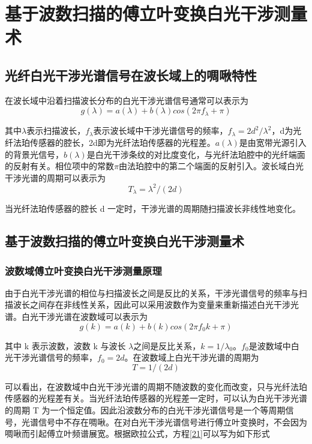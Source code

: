 \chapter{基于波数扫描的傅立叶变换白光干涉测量术}

\section{光纤白光干涉光谱信号在波长域上的啁啾特性}
在波长域中沿着扫描波长分布的白光干涉光谱信号通常可以表示为
\begin{equation}
g(\lambda)=a(\lambda)+b(\lambda)cos(2\pi f_{\lambda}+\pi)
\end{equation}


其中$\lambda$表示扫描波长，$f_{\lambda}$表示波长域中干涉光谱信号的频率，$f_{\lambda}=2d^{2}/\lambda^{2}$，d为光纤法珀传感器的腔长，2d即为光纤法珀传感器的光程差。$a(\lambda)$是由宽带光源引入的背景光信号，$b(\lambda)$是白光干涉条纹的对比度变化，与光纤法珀腔中的光纤端面的反射有关。相位项中的常数$\pi$由法珀腔中的第二个端面的反射引入。波长域白光干涉光谱的周期可以表示为
\begin{equation}
T_{\lambda}=\lambda^{2}/(2d)
\end{equation}


当光纤法珀传感器的腔长 d 一定时，干涉光谱的周期随扫描波长非线性地变化。
\section{基于波数扫描的傅立叶变换白光干涉测量术 }
\subsection{波数域傅立叶变换白光干涉测量原理 }
由于白光干涉光谱的相位与扫描波长之间是反比的关系，干涉光谱信号的频率与扫描波长之间存在非线性关系，因此可以采用波数作为变量来重新描述白光干涉光谱。白光干涉光谱在波数域可以表示为 
\begin{equation}
g(k)=a(k)+b(k)cos(2\pi f_{0}k+\pi)
\label{flyone1}
\end{equation}


其中 k 表示波数，波数 k 与波长 $\lambda$之间是反比关系，$k=1/\lambda_{0}$。$f_0$是波数域中白光干涉光谱信号的频率，$f_{0}=2d$。在波数域上白光干涉光谱的周期为
\begin{equation}
T=1/(2d)
\end{equation}


可以看出，在波数域中白光干涉光谱的周期不随波数的变化而改变，只与光纤法珀传感器的光程差有关。当光纤法珀传感器的光程差一定时，可以认为白光干涉光谱的周期 T 为一个恒定值。因此沿波数分布的白光干涉光谱信号是一个等周期信号，光谱信号中不存在啁啾。在对白光干涉光谱信号进行傅立叶变换时，不会因为啁啾而引起傅立叶频谱展宽。根据欧拉公式，方程\ref{21}可以写为如下形式 